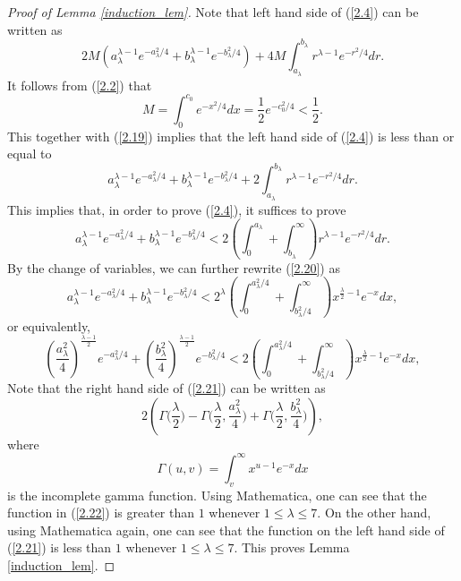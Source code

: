 \documentclass{amsart}
\theoremstyle{Corollary}
\numberwithin{equation}{section}
\begin{document}
\begin{proof}[Proof of Lemma \ref{induction_lem}]
Note that left hand side of (\ref{2.4}) can be written as 
\begin{equation}\label{2.19}
2M\left(a_\lambda^{\lambda-1} e^{-a_\lambda^2/4}+b_\lambda^{\lambda-1} e^{-b_\lambda^2/4}\right)
+4M\int_{a_\lambda}^{b_\lambda}r^{\lambda-1} e^{-r^2/4}dr.
\end{equation}
It follows from (\ref{2.2}) that 
$$M=\int_0^{c_0}e^{-x^2/4}dx=\frac{1}{2}e^{-c_0^2/4}<\frac{1}{2}.$$
This together with (\ref{2.19}) implies that the left hand side of (\ref{2.4})
is less than or equal to 
$$
a_\lambda^{\lambda-1} e^{-a_\lambda^2/4}+b_\lambda^{\lambda-1} e^{-b_\lambda^2/4}
+2\int_{a_\lambda}^{b_\lambda}r^{\lambda-1} e^{-r^2/4}dr.
$$
This implies that, in order to prove (\ref{2.4}), it suffices to prove 
\begin{equation}\label{2.20}
a_\lambda^{\lambda-1} e^{-a_\lambda^2/4}+b_\lambda^{\lambda-1} e^{-b_\lambda^2/4}
<2\left(\int_0^{a_\lambda}+\int_{b_\lambda}^\infty\right)r^{\lambda-1} e^{-r^2/4}dr.
\end{equation}
By the change of variables, we can further rewrite (\ref{2.20}) as 
$$
a_\lambda^{\lambda-1} e^{-a_\lambda^2/4}+b_\lambda^{\lambda-1} e^{-b_\lambda^2/4}
<2^\lambda\left(\int_0^{a_\lambda^2/4}+\int_{b_\lambda^2/4}^\infty\right)x^{\frac{\lambda}{2}-1} e^{-x}dx, 
$$
or equivalently, 
\begin{equation}\label{2.21}
\left(\frac{a_\lambda^2}{4}\right)^{\frac{\lambda-1}{2}} e^{-a_\lambda^2/4}+\left(\frac{b_\lambda^2}{4}\right)^{\frac{\lambda-1}{2}} e^{-b_\lambda^2/4}
<2\left(\int_0^{a_\lambda^2/4}+\int_{b_\lambda^2/4}^\infty\right)x^{\frac{\lambda}{2}-1} e^{-x}dx, 
\end{equation}
Note that the right hand side of (\ref{2.21}) can be written as 
\begin{equation}\label{2.22}
2\left(\Gamma\Big(\frac{\lambda}{2}\Big)-\Gamma\Big(\frac{\lambda}{2},\frac{a_\lambda^2}{4}\Big)+\Gamma\Big(\frac{\lambda}{2},\frac{b_\lambda^2}{4}\Big)\right),
\end{equation}
where
$$\Gamma(u,v)=\int_{v}^\infty x^{u-1}e^{-x}dx$$
is the incomplete gamma function. 
Using Mathematica, one can see that the function in (\ref{2.22}) 
is greater than $1$ whenever $1\leq\lambda\leq 7$. 
On the other hand, using Mathematica again, 
one can see that the function on the left hand side of (\ref{2.21}) 
is less than $1$ whenever $1\leq\lambda\leq 7$. 
This proves Lemma \ref{induction_lem}.   
\end{proof}
\end{document}

